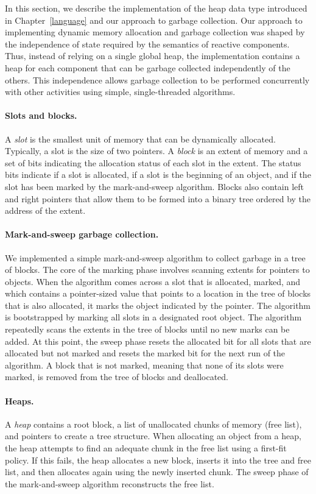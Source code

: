 In this section, we describe the implementation of the heap data type introduced in Chapter~\ref{language} and our approach to garbage collection.
Our approach to implementing dynamic memory allocation and garbage collection was shaped by the independence of state required by the semantics of reactive components.
Thus, instead of relying on a single global heap, the implementation contains a heap for each component that can be garbage collected independently of the others.
This independence allows garbage collection to be performed concurrently with other activities using simple, single-threaded algorithms.

\paragraph{Slots and blocks.}
A \emph{slot} is the smallest unit of memory that can be dynamically allocated.
Typically, a slot is the size of two pointers.
A \emph{block} is an extent of memory and a set of bits indicating the allocation status of each slot in the extent.
The status bits indicate if a slot is allocated, if a slot is the beginning of an object, and if the slot has been marked by the mark-and-sweep algorithm.
Blocks also contain left and right pointers that allow them to be formed into a binary tree ordered by the address of the extent.

\paragraph{Mark-and-sweep garbage collection.}
We implemented a simple mark-and-sweep algorithm to collect garbage in a tree of blocks.
The core of the marking phase involves scanning extents for pointers to objects.
When the algorithm comes across a slot that is allocated, marked, and which contains a pointer-sized value that points to a location in the tree of blocks that is also allocated, it marks the object indicated by the pointer.
The algorithm is bootstrapped by marking all slots in a designated root object.
The algorithm repeatedly scans the extents in the tree of blocks until no new marks can be added.
At this point, the sweep phase resets the allocated bit for all slots that are allocated but not marked and resets the marked bit for the next run of the algorithm.
A block that is not marked, meaning that none of its slots were marked, is removed from the tree of blocks and deallocated.

\paragraph{Heaps.}
A \emph{heap} contains a root block, a list of unallocated chunks of memory (free list), and pointers to create a tree structure.
When allocating an object from a heap, the heap attempts to find an adequate chunk in the free list using a first-fit policy.
If this fails, the heap allocates a new block, inserts it into the tree and free list, and then allocates again using the newly inserted chunk.
The sweep phase of the mark-and-sweep algorithm reconstructs the free list.

